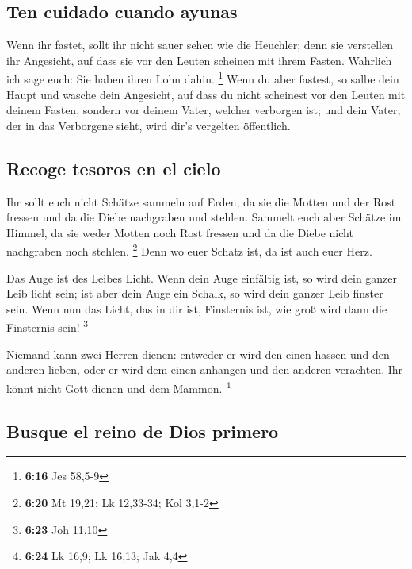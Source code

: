 \hypertarget{ten-cuidado-cuando-ayunas}{%
\subsection{Ten cuidado cuando ayunas}\label{ten-cuidado-cuando-ayunas}}

 Wenn ihr fastet, sollt ihr nicht sauer sehen wie die
Heuchler; denn sie verstellen ihr Angesicht, auf dass sie vor den Leuten
scheinen mit ihrem Fasten. Wahrlich ich sage euch: Sie haben ihren Lohn
dahin. \footnote{\textbf{6:16} Jes 58,5-9}  Wenn du aber
fastest, so salbe dein Haupt und wasche dein Angesicht, 
auf dass du nicht scheinest vor den Leuten mit deinem Fasten, sondern
vor deinem Vater, welcher verborgen ist; und dein Vater, der in das
Verborgene sieht, wird dir's vergelten öffentlich.

\hypertarget{recoge-tesoros-en-el-cielo}{%
\subsection{Recoge tesoros en el
cielo}\label{recoge-tesoros-en-el-cielo}}

 Ihr sollt euch nicht Schätze sammeln auf Erden, da sie
die Motten und der Rost fressen und da die Diebe nachgraben und stehlen.
 Sammelt euch aber Schätze im Himmel, da sie weder Motten
noch Rost fressen und da die Diebe nicht nachgraben noch stehlen.
\footnote{\textbf{6:20} Mt 19,21; Lk 12,33-34; Kol 3,1-2}
 Denn wo euer Schatz ist, da ist auch euer Herz.

 Das Auge ist des Leibes Licht. Wenn dein Auge einfältig
ist, so wird dein ganzer Leib licht sein;  ist aber dein
Auge ein Schalk, so wird dein ganzer Leib finster sein. Wenn nun das
Licht, das in dir ist, Finsternis ist, wie groß wird dann die Finsternis
sein! \footnote{\textbf{6:23} Joh 11,10}

 Niemand kann zwei Herren dienen: entweder er wird den
einen hassen und den anderen lieben, oder er wird dem einen anhangen und
den anderen verachten. Ihr könnt nicht Gott dienen und dem Mammon.
\footnote{\textbf{6:24} Lk 16,9; Lk 16,13; Jak 4,4}

\hypertarget{busque-el-reino-de-dios-primero}{%
\subsection{Busque el reino de Dios
primero}\label{busque-el-reino-de-dios-primero}}

